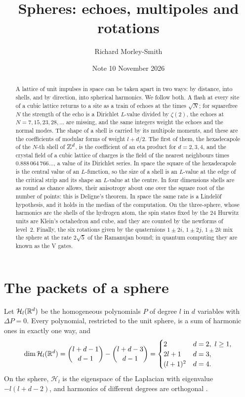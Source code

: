 \documentclass[11pt]{article}
\title{Spheres: echoes, multipoles and rotations}
\author{Richard Morley-Smith}
\date{Note 10 \quad November 2026}
\begin{document}
\maketitle

\begin{abstract}
\noindent
A lattice of unit impulses in space can be taken apart in two ways: by distance, into shells, and by direction, into spherical harmonics.
We follow both.
A flash at every site of a cubic lattice returns to a site as a train of echoes at the times $\sqrt N$; for squarefree $N$ the strength of the echo is a Dirichlet $L$-value divided by $\zeta(2)$, the echoes at $N = 7, 15, 23, 28,\dots$ are missing, and the same integers weight the echoes and the normal modes.
The shape of a shell is carried by its multipole moments, and these are the coefficients of modular forms of weight $l+d/2$.
The first of them, the hexadecapole of the $N$-th shell of $\mathbb{Z}^d$, is the coefficient of an eta product for $d = 2,3,4$, and the crystal field of a cubic lattice of charges is the field of the nearest neighbours times $0.888\,064\,766\ldots$, a value of its Dirichlet series.
In space the square of the hexadecapole is the central value of an $L$-function, so the size of a shell is an $L$-value at the edge of the critical strip and its shape an $L$-value at the centre.
In four dimensions shells are as round as chance allows, their anisotropy about one over the square root of the number of points: this is Deligne's theorem. In space the same rate is a Lindel\"of hypothesis, and it holds in the median of the computation.
On the three-sphere, whose harmonics are the shells of the hydrogen atom, the spin states fixed by the 24 Hurwitz units are Klein's octahedron and cube, and they are counted by the newforms of level~2.
Finally, the six rotations given by the quaternions $1\pm2i$, $1\pm2j$, $1\pm2k$ mix the sphere at the rate $2\sqrt5$ of the Ramanujan bound; in quantum computing they are known as the V gates.
\end{abstract}

\section{The packets of a sphere}

\begin{derivation}\label{d:packets}
Let $\mathcal H_l(\mathbb{R}^d)$ be the homogeneous polynomials $P$ of degree $l$ in $d$ variables with $\Delta P = 0$.
Every polynomial, restricted to the unit sphere, is a sum of harmonic ones in exactly one way, and
\[
  \dim\mathcal H_l(\mathbb{R}^d) = \binom{l+d-1}{d-1}-\binom{l+d-3}{d-1} =
  \begin{cases} 2 & d=2,\ l\ge1,\\ 2l+1 & d=3,\\ (l+1)^2 & d=4.\end{cases}
\]
On the sphere, $\mathcal H_l$ is the eigenspace of the Laplacian with eigenvalue $-l(l+d-2)$, and harmonics of different degrees are orthogonal \cite{SteinWeiss}.
\end{derivation}
\end{document}
